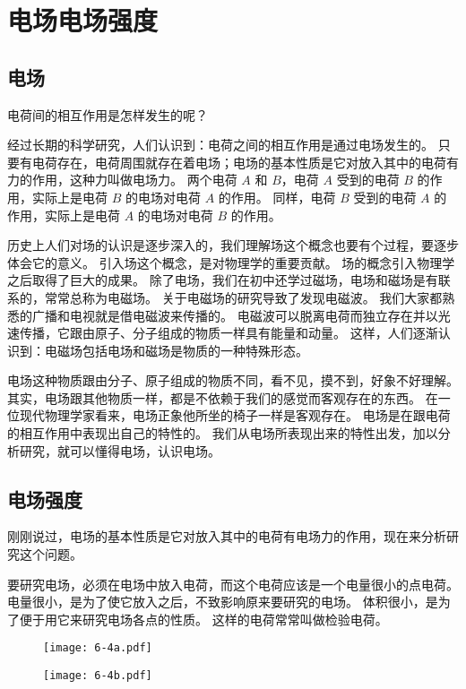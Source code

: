 \section{电场\texorpdfstring{\quad}{ }电场强度}

\subsection{电场}
电荷间的相互作用是怎样发生的呢？

经过长期的科学研究，人们认识到：电荷之间的相互作用是通过电场发生的。
只要有电荷存在，电荷周围就存在着电场；电场的基本性质是它对放入其中的电荷有力的作用，这种力叫做电场力。
两个电荷 $A$ 和 $B$，电荷 $A$ 受到的电荷 $B$ 的作用，实际上是电荷 $B$ 的电场对电荷 $A$ 的作用。
同样，电荷 $B$ 受到的电荷 $A$ 的作用，实际上是电荷 $A$ 的电场对电荷 $B$ 的作用。

历史上人们对场的认识是逐步深入的，我们理解场这个概念也要有个过程，要逐步体会它的意义。
引入场这个概念，是对物理学的重要贡献。
场的概念引入物理学之后取得了巨大的成果。
除了电场，我们在初中还学过磁场，电场和磁场是有联系的，常常总称为电磁场。
关于电磁场的研究导致了发现电磁波。
我们大家都熟悉的广播和电视就是借电磁波来传播的。
电磁波可以脱离电荷而独立存在并以光速传播，它跟由原子、分子组成的物质一样具有能量和动量。
这样，人们逐渐认识到：电磁场包括电场和磁场是物质的一种特殊形态。

电场这种物质跟由分子、原子组成的物质不同，看不见，摸不到，好象不好理解。
其实，电场跟其他物质一样，都是不依赖于我们的感觉而客观存在的东西。
在一位现代物理学家看来，电场正象他所坐的椅子一样是客观存在。
电场是在跟电荷的相互作用中表现出自己的特性的。
我们从电场所表现出来的特性出发，加以分析研究，就可以懂得电场，认识电场。

\subsection{电场强度} 

刚刚说过，电场的基本性质是它对放入其中的电荷有电场力的作用，现在来分析研究这个问题。

要研究电场，必须在电场中放入电荷，而这个电荷应该是一个电量很小的点电荷。
电量很小，是为了使它放入之后，不致影响原来要研究的电场。
体积很小，是为了便于用它来研究电场各点的性质。
这样的电荷常常叫做检验电荷。
\begin{figure}
	\begin{minipage}[b]{0.4\linewidth}\centering
		\texttt{[image: 6-4a.pdf]}
		\subcaption{}\label{fig:6-4a}
	\end{minipage}
	\begin{minipage}[b]{0.56\linewidth}\centering
		\texttt{[image: 6-4b.pdf]}
		\subcaption{}\label{fig:6-4b}
	\end{minipage}
	\caption{}\label{fig:6-4}
\end{figure}

